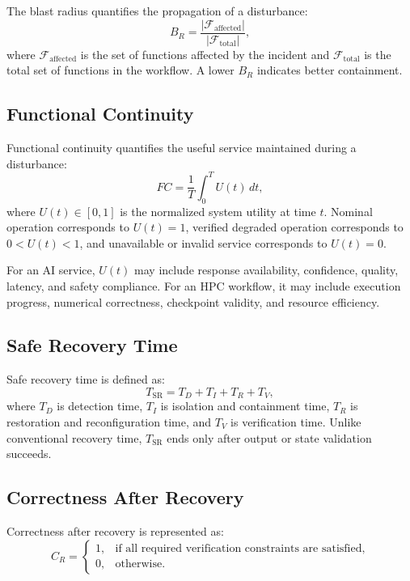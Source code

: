 \documentclass[conference]{IEEEtran}
\begin{document}
The blast radius quantifies the propagation of a disturbance:
\begin{equation}
B_R = \frac{|\mathcal{F}_{\mathrm{affected}}|}{|\mathcal{F}_{\mathrm{total}}|},
\end{equation}
where $\mathcal{F}_{\mathrm{affected}}$ is the set of functions affected by the incident and $\mathcal{F}_{\mathrm{total}}$ is the total set of functions in the workflow. A lower $B_R$ indicates better containment.

\subsection{Functional Continuity}

Functional continuity quantifies the useful service maintained during a disturbance:
\begin{equation}
FC = \frac{1}{T}\int_0^T U(t)\,dt,
\end{equation}
where $U(t) \in [0,1]$ is the normalized system utility at time $t$. Nominal operation corresponds to $U(t)=1$, verified degraded operation corresponds to $0<U(t)<1$, and unavailable or invalid service corresponds to $U(t)=0$.

For an AI service, $U(t)$ may include response availability, confidence, quality, latency, and safety compliance. For an HPC workflow, it may include execution progress, numerical correctness, checkpoint validity, and resource efficiency.

\subsection{Safe Recovery Time}

Safe recovery time is defined as:
\begin{equation}
T_{\mathrm{SR}} = T_D + T_I + T_R + T_V,
\end{equation}
where $T_D$ is detection time, $T_I$ is isolation and containment time, $T_R$ is restoration and reconfiguration time, and $T_V$ is verification time. Unlike conventional recovery time, $T_{\mathrm{SR}}$ ends only after output or state validation succeeds.

\subsection{Correctness After Recovery}

Correctness after recovery is represented as:
\begin{equation}
C_R =
\begin{cases}
1, & \text{if all required verification constraints are satisfied}, \\
0, & \text{otherwise}.
\end{cases}
\end{equation}
\end{document}
